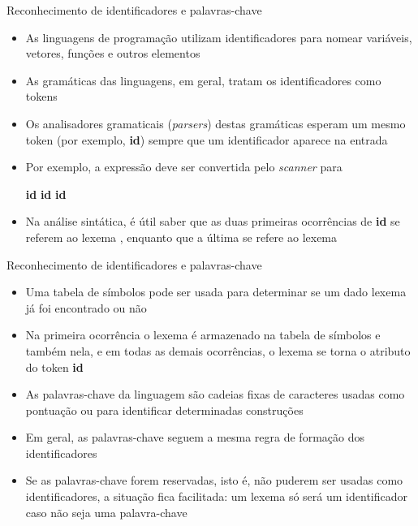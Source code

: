 \begin{frame}[fragile]{Reconhecimento de identificadores e palavras-chave}

    \begin{itemize}
        \item As linguagens de programação utilizam identificadores para nomear variáveis, vetores, funções e outros elementos

        \item As gramáticas das linguagens, em geral, tratam os identificadores como tokens

        \item Os analisadores gramaticais (\textit{parsers}) destas gramáticas esperam um mesmo token (por exemplo, \textbf{id}) sempre que um identificador
            aparece na entrada

        \item Por exemplo, a expressão  deve ser convertida pelo \textit{scanner} para 
        \begin{center}
            \textbf{id}  \textbf{id}  \textbf{id}
        \end{center}

        \item Na análise sintática, é útil saber que as duas primeiras ocorrências de \textbf{id} se referem ao lexema , enquanto que a última
            se refere ao lexema 
    \end{itemize}

\end{frame}

\begin{frame}[fragile]{Reconhecimento de identificadores e palavras-chave}

    \begin{itemize}
        \item Uma tabela de símbolos pode ser usada para determinar se um dado lexema já foi encontrado ou não

        \item Na primeira ocorrência o lexema é armazenado na tabela de símbolos e também nela, e em todas as demais ocorrências, o lexema se torna o atributo
            do token \textbf{id}

        \item As palavras-chave da linguagem são cadeias fixas de caracteres usadas como pontuação ou para identificar determinadas construções

        \item Em geral, as palavras-chave seguem a mesma regra de formação dos identificadores

        \item Se as palavras-chave forem reservadas, isto é, não puderem ser usadas como identificadores, a situação fica facilitada: um lexema só será um
            identificador caso não seja uma palavra-chave
    \end{itemize}

\end{frame}


